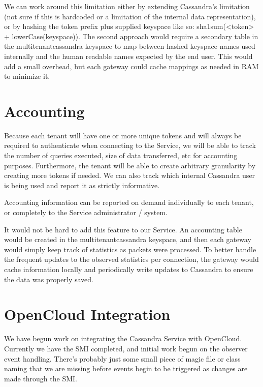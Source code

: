 \documentclass[11pt,notitlepage]{report}
\begin{document}
We can work around this limitation either by extending Cassandra's limitation (not sure if this is hardcoded or a limitation of the internal data representation), or by hashing the token prefix plus supplied keyspace like so: sha1sum(<token> + lowerCase(keyspace)). The second approach would require a secondary table in the multitenantcassandra keyspace to map between hashed keyspace names used internally and the human readable names expected by the end user. This would add a small overhead, but each gateway could cache mappings as needed in RAM to minimize it.


\section*{Accounting}

Because each tenant will have one or more unique tokens and will always be required to authenticate when connecting to the Service, we will be able to track the number of queries executed, size of data transferred, etc for accounting purposes. Furthermore, the tenant will be able to create arbitrary granularity by creating more tokens if needed. We can also track which internal Cassandra user is being used and report it as strictly informative.

Accounting information can be reported on demand individually to each tenant, or completely to the Service administrator / system.

It would not be hard to add this feature to our Service. An accounting table would be created in the multitenantcassandra keyspace, and then each gateway would simply keep track of statistics as packets were processed. To better handle the frequent updates to the observed statistics per connection, the gateway would cache information locally and periodically write updates to Cassandra to ensure the data was properly saved.

\section*{OpenCloud Integration}

We have begun work on integrating the Cassandra Service with OpenCloud. Currently we have the SMI completed, and initial work begun on the observer event handling. There's probably just some small piece of magic file or class naming that we are missing before events begin to be triggered as changes are made through the SMI.
\end{document}
